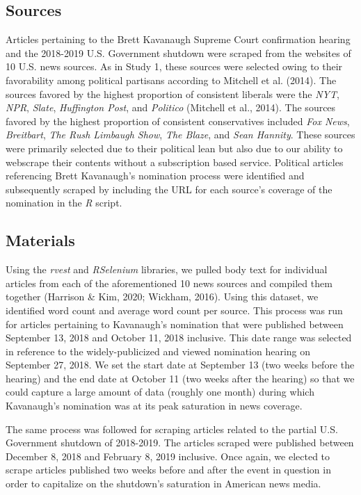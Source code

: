 \documentclass[
  man,floatsintext]{apa6}
\begin{document}
\hypertarget{sources-1}{%
\subsection{Sources}\label{sources-1}}

Articles pertaining to the Brett Kavanaugh Supreme Court confirmation hearing and the 2018-2019 U.S. Government shutdown were scraped from the websites of 10 U.S. news sources. As in Study 1, these sources were selected owing to their favorability among political partisans according to Mitchell et al. (2014). The sources favored by the highest proportion of consistent liberals were the \emph{NYT}, \emph{NPR}, \emph{Slate}, \emph{Huffington Post}, and \emph{Politico} (Mitchell et al., 2014). The sources favored by the highest proportion of consistent conservatives included \emph{Fox News}, \emph{Breitbart}, \emph{The Rush Limbaugh Show}, \emph{The Blaze}, and \emph{Sean Hannity}. These sources were primarily selected due to their political lean but also due to our ability to webscrape their contents without a subscription based service. Political articles referencing Brett Kavanaugh's nomination process were identified and subsequently scraped by including the URL for each source's coverage of the nomination in the \emph{R} script.

\hypertarget{materials-1}{%
\subsection{Materials}\label{materials-1}}

Using the \emph{rvest} and \emph{RSelenium} libraries, we pulled body text for individual articles from each of the aforementioned 10 news sources and compiled them together (Harrison \& Kim, 2020; Wickham, 2016). Using this dataset, we identified word count and average word count per source. This process was run for articles pertaining to Kavanaugh's nomination that were published between September 13, 2018 and October 11, 2018 inclusive. This date range was selected in reference to the widely-publicized and viewed nomination hearing on September 27, 2018. We set the start date at September 13 (two weeks before the hearing) and the end date at October 11 (two weeks after the hearing) so that we could capture a large amount of data (roughly one month) during which Kavanaugh's nomination was at its peak saturation in news coverage.

The same process was followed for scraping articles related to the partial U.S. Government shutdown of 2018-2019. The articles scraped were published between December 8, 2018 and February 8, 2019 inclusive. Once again, we elected to scrape articles published two weeks before and after the event in question in order to capitalize on the shutdown's saturation in American news media.
\end{document}
